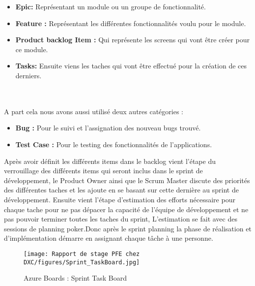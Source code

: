 \begin{itemize}
  \item \textbf{Epic:} Représentant un module ou un groupe de fonctionnalité.
  \\
  \item \textbf{Feature :} Représentant les différentes fonctionnalités voulu pour le module.
  \\
  \item \textbf{Product backlog Item :} Qui représente les screens qui vont être créer pour ce module.
  \\
  \item \textbf{Tasks:} Ensuite viens les taches qui vont être effectué pour la création de ces derniers.
\end{itemize}

\\\\

A part cela nous avons aussi utilisé deux autres catégories :
\\

\begin{itemize}
  \item \textbf{Bug :} Pour le suivi et l’assignation des nouveau bugs trouvé.
  \\
  \item \textbf{Test Case :} Pour le testing des fonctionnalités de l’applications.
\end{itemize}

\vspace{\baselineskip}
Après avoir définit les différents items dans le backlog vient l'étape du verrouillage des différents items qui seront inclus dans le sprint de développement, le Product Owner ainsi que le Scrum Master discute des priorités des différentes taches et les ajoute en se basant sur cette dernière au sprint de développement.
Ensuite vient l'étape d'estimation des efforts nécessaire pour chaque tache pour ne pas dépacer la capacité de l'équipe de développement et ne pas pouvoir terminer toutes les taches du sprint, L'estimation se fait avec des sessions de planning poker.Donc après le sprint planning la phase de réalisation et d’implémentation démarre en assignant chaque tâche à une personne.


\begin{figure}[H]
    \centering
    \texttt{[image: Rapport de stage PFE chez DXC/figures/Sprint\_TaskBoard.jpg]}
    \caption{Azure Boards : Sprint Task Board}
\end{figure}

